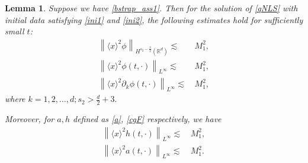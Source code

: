 \documentclass[10pt,twoside,a4paper]{article}
\newtheorem{lem}[thm]{Lemma}
\numberwithin{equation}{section}\allowdisplaybreaks
\begin{document}
\begin{lem}
	Suppose we have \eqref{bstrap_ass1}. Then for the solution of \eqref{qNLS} with initial data satisfying \eqref{ini1} and \eqref{ini2}, the following estimates hold for sufficiently small $t$: 
	\begin{align}
		\left\|\langle x\rangle^{2}\phi\right\|_{H^{s_2-\frac 32}(\mathbb{R}^d)} \lesssim &\, M_1^2,\label{big_w_est1}\\
		\left\|  \langle x\rangle^2\phi (t,\cdot) \right\|_{L^\infty}\lesssim &\, M_1^2,\label{big_w_est2}\\
		\left\|  \langle x\rangle^2 \partial_k\phi (t,\cdot) \right\|_{L^\infty}\lesssim &\, M_1^2, \label{big_w_est3}
	\end{align}
	where $ k=1,2,\dots, d; s_2>\frac d2+3. $
 
 Moreover, for $a,h$ defined as \eqref{a}, \eqref{cgF} respectively, we have
 \begin{align}
     \left\|  \langle x\rangle^2 h  (t,\cdot) \right\|_{L^\infty}\lesssim &\, M_1^2, \label{big_w_est_h}\\
\left\|  \langle x\rangle^2 a  (t,\cdot) \right\|_{L^\infty}\lesssim &\, M_1^2. \label{big_w_est_a}
 \end{align}
\end{lem}
\end{document}
